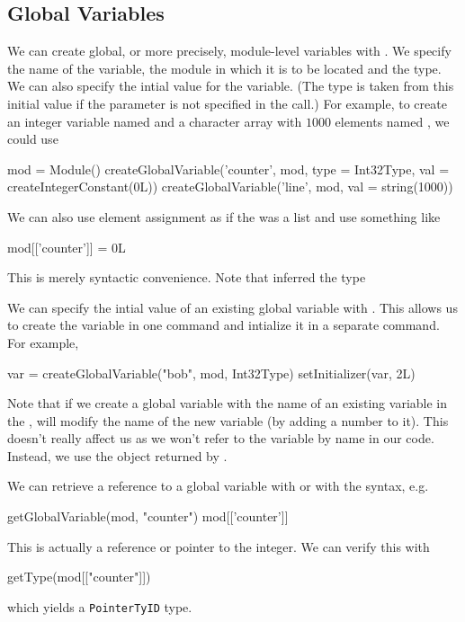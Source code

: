 \documentclass[article]{jss}
\begin{document}
\subsection{Global Variables}
We can create global, or more precisely, module-level 
variables with .
We specify the name of the variable, the module in which it is
to be located and the type.
We can also specify the intial value for the variable.
(The type is taken from this initial value if the 
parameter is not specified in the call.)
For example, to create an integer variable named 
and a character array with $1000$ elements named ,
we could use
\begin{RCode}
mod = Module()
createGlobalVariable('counter', mod, type = Int32Type, 
                      val = createIntegerConstant(0L))
createGlobalVariable('line', mod, val = string(1000))
\end{RCode}
We can also use element assignment as if the 
 was a list and use something like
\begin{RCode}
mod[['counter']] = 0L
\end{RCode}
This is merely syntactic convenience. Note
that  inferred the type

We can specify the intial value of an existing 
global variable with  .
This allows us to create the variable in one command
and intialize it in a separate command.
For example,
\begin{RCode}
var = createGlobalVariable("bob", mod, Int32Type)
setInitializer(var, 2L)
\end{RCode}

Note that if we create a global variable with the name of an existing
variable in the , \llvm{} will modify the name of the
new variable (by adding a number to it).  This doesn't really affect
us as we won't refer to the variable by name in our code. Instead, we
use the object returned by .


We can retrieve a reference to a global variable with
 or with the \Rop{[[} syntax, e.g.
\begin{RCode}
getGlobalVariable(mod, "counter")
mod[['counter']]
\end{RCode}
This is actually a reference or pointer to the integer.
We can verify this with
\begin{RCode}
getType(mod[["counter"]])
\end{RCode}
which yields a \texttt{PointerTyID} type.
\end{document}
